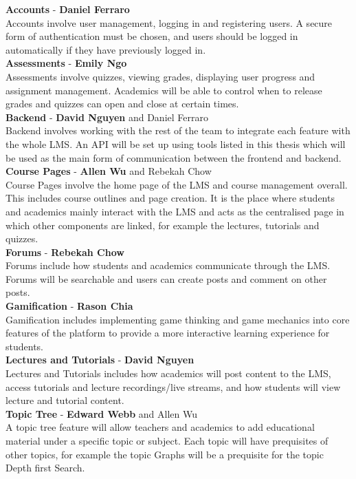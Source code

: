 \textbf{Accounts} - \textbf{Daniel Ferraro} \\
Accounts involve user management, logging in and registering users. A secure form of authentication must be chosen, and users should be logged in automatically if they have previously logged in. \\

\textbf{Assessments} - \textbf{Emily Ngo} \\
Assessments involve quizzes, viewing grades, displaying user progress and assignment management. Academics will be able to control when to release grades and quizzes can open and close at certain times. \\

\textbf{Backend} - \textbf{David Nguyen} and Daniel Ferraro \\
Backend involves working with the rest of the team to integrate each feature with the whole LMS. An API will be set up using tools listed in this thesis which will be used as the main form of communication between the frontend and backend. \\

\textbf{Course Pages} - \textbf{Allen Wu} and Rebekah Chow \\
Course Pages involve the home page of the LMS and course management overall. This includes course outlines and page creation. It is the place where students and academics mainly interact with the LMS and acts as the centralised page in which other components are linked, for example the lectures, tutorials and quizzes. \\

\textbf{Forums} - \textbf{Rebekah Chow} \\
Forums include how students and academics communicate through the LMS. Forums will be searchable and users can create posts and comment on other posts.\\

\textbf{Gamification} - \textbf{Rason Chia} \\
Gamification includes implementing game thinking and game mechanics into core features of the platform to provide a more interactive learning experience for students.\\

\textbf{Lectures and Tutorials} - \textbf{David Nguyen} \\
Lectures and Tutorials includes how academics will post content to the LMS, access tutorials and lecture recordings/live streams, and how students will view lecture and tutorial content.\\

\textbf{Topic Tree} - \textbf{Edward Webb} and Allen Wu \\
A topic tree feature will allow teachers and academics to add educational material under a specific topic or subject. Each topic will have prequisites of other topics, for example the topic Graphs will be a prequisite for the topic Depth first Search.
